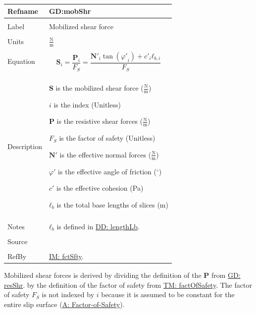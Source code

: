 \documentclass[12pt]{article}
\begin{document}
\noindent \begin{minipage}{\textwidth}
\begin{tabular}{p{} p{}}
\toprule \textbf{Refname} & \textbf{GD:mobShr}
\label{GD:mobShr}
\\ \midrule \\
Label & Mobilized shear force
\\ \midrule \\
Units & $\frac{\text{N}}{\text{m}}$
\\ \midrule \\
Equation & \begin{displaymath}
           {\mathbf{S}}_{i}=\frac{{\mathbf{P}}_{i}}{{F_{S}}}=\frac{{\mathbf{N'}}_{i} \tan\left({φ'}_{i}\right)+{c'}_{i} {\mathbf{ℓ}_{b,i}}}{{F_{S}}}
           \end{displaymath}
\\ \midrule \\
Description & \begin{symbDescription}
              \item{$\mathbf{S}$ is the mobilized shear force ($\frac{\text{N}}{\text{m}}$)}
              \item{$i$ is the index (Unitless)}
              \item{$\mathbf{P}$ is the resistive shear forces ($\frac{\text{N}}{\text{m}}$)}
              \item{${F_{S}}$ is the factor of safety (Unitless)}
              \item{$\mathbf{N'}$ is the effective normal forces ($\frac{\text{N}}{\text{m}}$)}
              \item{$φ'$ is the effective angle of friction (${}^{\circ}$)}
              \item{$c'$ is the effective cohesion (Pa)}
              \item{${\mathbf{ℓ}_{b}}$ is the total base lengths of slices (m)}
              \end{symbDescription}
\\ \midrule \\
Notes & ${\mathbf{ℓ}_{b}}$ is defined in \hyperref[DD:lengthLb]{DD: lengthLb}.
\\ \midrule \\
Source & \cite{chen2005}
\\ \midrule \\
RefBy & \hyperref[IM:fctSfty]{IM: fctSfty}.
\\ \bottomrule \end{tabular}
\end{minipage}
Mobilized shear forces is derived by dividing the definition of the $\mathbf{P}$ from \hyperref[GD:resShr]{GD: resShr}. by the definition of the factor of safety from \hyperref[TM:factOfSafety]{TM: factOfSafety}. The factor of safety ${F_{S}}$ is not indexed by $i$ because it is assumed to be constant for the entire slip surface (\hyperref[assumpFOS]{A: Factor-of-Safety}).
\par~
\end{document}
